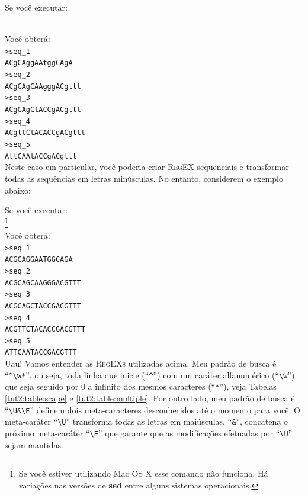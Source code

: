 \begin{refsection}
Se você executar:

\\

Você obterá:\\
\texttt{>seq\_1}\\
\texttt{ACgCAggAAtggCAgA}\\
\texttt{>seq\_2}\\
\texttt{ACgCAgCAAgggACgttt}\\
\texttt{>seq\_3}\\
\texttt{ACgCAgCtACCgACgttt}\\
\texttt{>seq\_4}\\
\texttt{ACgttCtACACCgACgttt}\\
\texttt{>seq\_5}\\
\texttt{AttCAAtACCgACgttt}\\

Neste caso em particular, você poderia criar \textsc{RegEX} sequenciais e transformar todas as sequências em letras minúsculas. No entanto, considerem o exemplo abaixo:

Se você executar:\\
\footnote{Se você estiver utilizando Mac OS X esse comando não funciona. Há variações nas versões de \textbf{sed} entre alguns sistemas operacionais.}\\

Você obterá:\\
\texttt{>seq\_1}\\
\texttt{ACGCAGGAATGGCAGA}\\
\texttt{>seq\_2}\\
\texttt{ACGCAGCAAGGGACGTTT}\\
\texttt{>seq\_3}\\
\texttt{ACGCAGCTACCGACGTTT}\\
\texttt{>seq\_4}\\
\texttt{ACGTTCTACACCGACGTTT}\\
\texttt{>seq\_5}\\
\texttt{ATTCAATACCGACGTTT}\\

Uau! Vamos entender as \textsc{RegEXs} utilizadas acima. Meu padrão de busca é ``\texttt{\^{}\textbackslash w*}'', ou seja, toda linha que inicie (``\texttt{\^{}}'') com um caráter alfanumérico (``\texttt{\textbackslash w}'') que seja seguido por 0 a infinito dos mesmos caracteres (``\texttt{*}''), veja Tabelas \ref{tut2:table:scape} e \ref{tut2:table:multiple}. Por outro lado, meu padrão de busca é ``\texttt{\textbackslash U\&\textbackslash E}'' definem dois meta-caracteres desconhecidos até o momento para você. O meta-caráter ``\texttt{\textbackslash U}'' transforma todas as letras em maiúsculas, ``\texttt{\&}'', concatena o próximo meta-caráter ``\texttt{\textbackslash E}'' que garante que as modificações efetuadas por ``\texttt{\textbackslash U}'' sejam mantidas.\\


\end{refsection}
